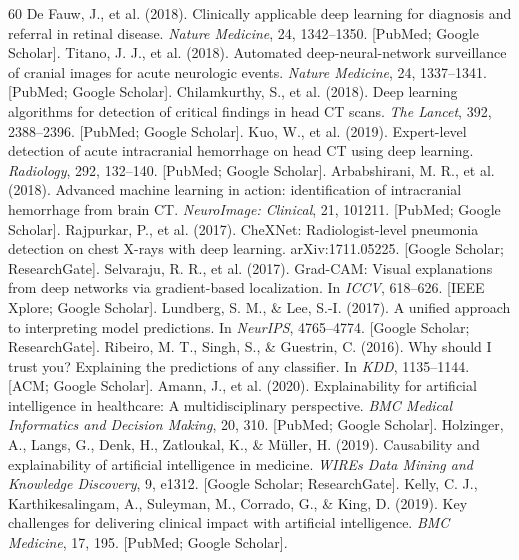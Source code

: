 \documentclass[10pt,a4paper]{article}
\begin{document}
\begin{thebibliography}{60}
 De Fauw, J., et al. (2018). Clinically applicable deep learning for diagnosis and referral in retinal disease. \textit{Nature Medicine}, 24, 1342--1350. [PubMed; Google Scholar].
 Titano, J. J., et al. (2018). Automated deep-neural-network surveillance of cranial images for acute neurologic events. \textit{Nature Medicine}, 24, 1337--1341. [PubMed; Google Scholar].
 Chilamkurthy, S., et al. (2018). Deep learning algorithms for detection of critical findings in head CT scans. \textit{The Lancet}, 392, 2388--2396. [PubMed; Google Scholar].
 Kuo, W., et al. (2019). Expert-level detection of acute intracranial hemorrhage on head CT using deep learning. \textit{Radiology}, 292, 132--140. [PubMed; Google Scholar].
 Arbabshirani, M. R., et al. (2018). Advanced machine learning in action: identification of intracranial hemorrhage from brain CT. \textit{NeuroImage: Clinical}, 21, 101211. [PubMed; Google Scholar].
 Rajpurkar, P., et al. (2017). CheXNet: Radiologist-level pneumonia detection on chest X-rays with deep learning. arXiv:1711.05225. [Google Scholar; ResearchGate].
 Selvaraju, R. R., et al. (2017). Grad-CAM: Visual explanations from deep networks via gradient-based localization. In \textit{ICCV}, 618--626. [IEEE Xplore; Google Scholar].
 Lundberg, S. M., \& Lee, S.-I. (2017). A unified approach to interpreting model predictions. In \textit{NeurIPS}, 4765--4774. [Google Scholar; ResearchGate].
 Ribeiro, M. T., Singh, S., \& Guestrin, C. (2016). Why should I trust you? Explaining the predictions of any classifier. In \textit{KDD}, 1135--1144. [ACM; Google Scholar].
 Amann, J., et al. (2020). Explainability for artificial intelligence in healthcare: A multidisciplinary perspective. \textit{BMC Medical Informatics and Decision Making}, 20, 310. [PubMed; Google Scholar].
 Holzinger, A., Langs, G., Denk, H., Zatloukal, K., \& Müller, H. (2019). Causability and explainability of artificial intelligence in medicine. \textit{WIREs Data Mining and Knowledge Discovery}, 9, e1312. [Google Scholar; ResearchGate].
 Kelly, C. J., Karthikesalingam, A., Suleyman, M., Corrado, G., \& King, D. (2019). Key challenges for delivering clinical impact with artificial intelligence. \textit{BMC Medicine}, 17, 195. [PubMed; Google Scholar].

\end{thebibliography}
\end{document}

